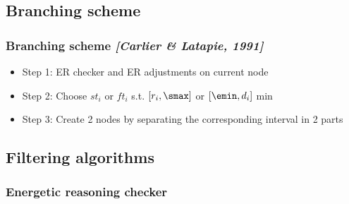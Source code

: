 \subsection{Branching scheme}

\begin{frame}
  \frametitle{Branching scheme {\small \it \color{gray!50!black!50} [Carlier \& Latapie, 1991]}}
  \begin{itemize}
    \vfill
  \item Step 1: ER checker and ER adjustments on current node 
    \vfill    
  \item Step 2: Choose $st_i$ or $ft_i$ s.t. $[r_i,\smax]$ or
    $[\emin,d_i]$ min
    \vfill
  \item Step 3: Create 2 nodes by separating the corresponding interval in 2 parts
  \end{itemize}
  \begin{overlayarea}{\textwidth}{4cm}
  \end{overlayarea}
  \vfill
\end{frame}

\subsection{Filtering algorithms}
\subsubsection{Energetic reasoning checker}

